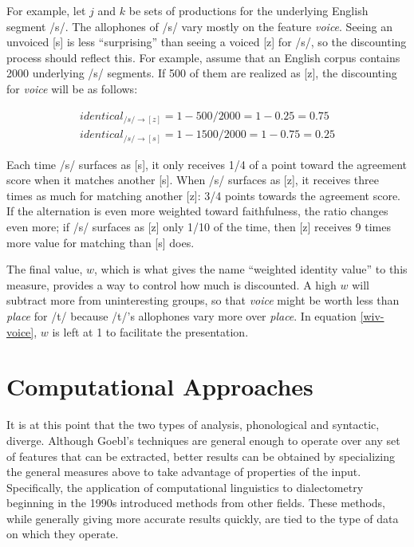 \documentclass[11pt]{article}
\begin{document}
  For example, let $j$ and $k$ be sets of productions for the
  underlying English segment /s/. The allophones of /s/ vary mostly on the feature
  \textit{voice}. Seeing an unvoiced [s] is less ``surprising'' than
  seeing a voiced [z] for /s/, so the discounting process should
  reflect this. For example, assume that an English corpus contains 2000
  underlying /s/ segments. If 500 of them are realized as [z], the
  discounting for \textit{voice} will be as follows:

  \begin{equation}
    \begin{array}{c}
      identical_{/s/\to[z]} = 1 - 500/2000 = 1 - 0.25 = 0.75 \\
      identical_{/s/\to[s]} = 1 - 1500/2000 = 1 - 0.75 = 0.25
    \end{array}
    \label{wiv-voice}
  \end{equation}

  Each time /s/ surfaces as [s], it only receives 1/4 of a point
  toward the agreement score when it matches another [s]. When /s/
  surfaces as [z], it receives three times as much for matching
  another [z]: 3/4 points towards the agreement score. If the
  alternation is even more weighted toward faithfulness, the ratio
  changes even more; if /s/ surfaces as [z] only 1/10 of the time,
  then [z] receives 9 times more value for matching than [s] does.

  The final value, $w$, which is what gives the name ``weighted
  identity value'' to this measure, provides a way to control how much
  is discounted. A high $w$ will subtract more from uninteresting
  groups, so that \textit{voice} might be worth less than
  \textit{place} for /t/ because /t/'s allophones vary more over
  \textit{place}. In equation \ref{wiv-voice}, $w$ is left at 1 to
  facilitate the presentation.


\section{Computational Approaches}

It is at this point that the two types of analysis, phonological and
syntactic, diverge. Although Goebl's techniques are general enough to
operate over any set of features that can be extracted, better results
can be obtained by specializing the general measures above to take
advantage of properties of the input.  Specifically, the application
of computational linguistics to dialectometry beginning in the 1990s
introduced methods from other fields. These methods, while generally
giving more accurate results quickly, are tied to the type of data on
which they operate.
\end{document}
